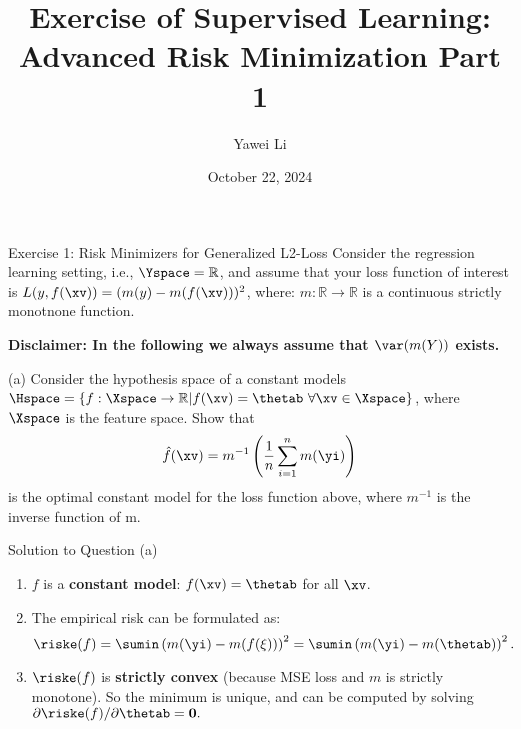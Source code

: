 \documentclass[aspectratio=169, handout]{beamer}
\title[]{\textbf{Exercise of Supervised Learning:\\ Advanced Risk Minimization Part 1}}
\author{Yawei Li}
\institute[LMU]
{
\\
  \texttt{yawei.li@stat.uni-muenchen.de}
}
\date{October 22, 2024}
\begin{document}
\begin{frame}
\titlepage

\end{frame}

\begin{frame}{Exercise 1: Risk Minimizers for Generalized L2-Loss}
Consider the regression learning setting, i.e., $\Yspace = \mathbb{R}$, and assume that your loss function of interest is $L(y, f(\xv)) = (m(y) - m(f(\xv)))^2$, where: $m: \mathbb{R} \to \mathbb{R}$ is a continuous strictly monotnone function.

\textbf{Disclaimer: In the following we always assume that $\var(m(Y))$ exists.}

(a) Consider the hypothesis space of a constant models $\Hspace = \{f: \Xspace \rightarrow \mathbb{R} | f(\xv) = \thetab \ \forall \xv \in \Xspace \}$, where $\Xspace$ is the feature space. Show that 
$$
	\hat{f}(\xv) = m^{-1}\left( \frac{1}{n} \sum_{i=1}^n m(\yi) \right)
$$
is the optimal constant model for the loss function above, where $m^{-1}$ is the inverse function of m.
	
\end{frame}

\begin{frame}{Solution to Question (a)}
	\begin{enumerate}
		\item<1-> $f$ is a \textbf{constant model}: $f(\xv) = \thetab$ for all $\xv$.
		\item<2-> The empirical risk can be formulated as:
			$$\riske(f) = \sumin \left(m(\yi) - m(f(\xi)) \right)^2 = \sumin \left(m(\yi) - m(\thetab) \right)^2.$$
		\item<3-> $\riske(f)$ is \textbf{strictly convex} (because MSE loss and $m$ is strictly monotone). So the minimum is unique, and can be computed by solving $\partial{\riske(f)} / \partial \thetab = \bm{0}.$
	\end{enumerate}
\end{frame}
\end{document}
